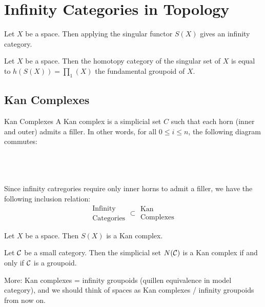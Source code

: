 \documentclass[a4paper]{article}
\begin{document}
\pagebreak
\section{Infinity Categories in Topology}
\begin{lmm}{}{} Let $X$ be a space. Then applying the singular functor $S(X)$ gives an infinity category. 
\end{lmm}

\begin{prp}{}{} Let $X$ be a space. Then the homotopy category of the singular set of $X$ is equal to $h(S(X))=\prod_1(X)$ the fundamental groupoid of $X$. 
\end{prp}

\subsection{Kan Complexes}
\begin{defn}{Kan Complexes}{} A Kan complex is a simplicial set $C$ such that each horn (inner and outer) admits a filler. In other words, for all $0\leq i\leq n$, the following diagram commutes: \\~\\
\\~\\
\end{defn}

Since infinity catregories require only inner horns to admit a filler, we have the following inclusion relation: $$\substack{\text{Infinity}\\\text{Categories}}\subset\substack{\text{Kan}\\\text{Complexes}}$$

\begin{prp}{}{} Let $X$ be a space. Then $S(X)$ is a Kan complex. 
\end{prp}

\begin{thm}{}{} Let $\mathcal{C}$ be a small category. Then the simplicial set $N(\mathcal{C})$ is a Kan complex if and only if $\mathcal{C}$ is a groupoid. 
\end{thm}

More: Kan complexes = infinity groupoids (quillen equivalence in model category), and we should think of spaces as Kan complexes / infinity groupoids from now on. 
\end{document}
